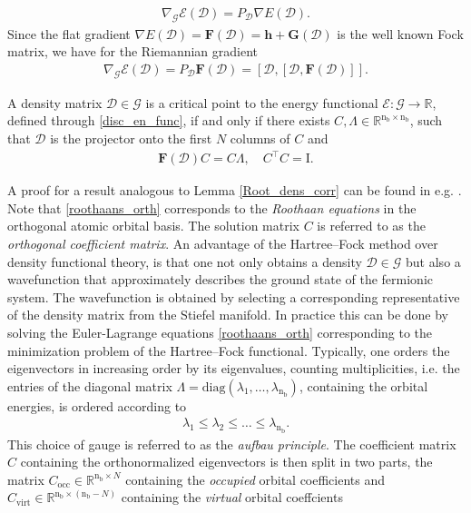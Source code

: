 \documentclass[reqno]{amsart}
\begin{document}
\begin{align}
    \nabla_\mathcal{G}\mathcal{E}(\mathscr{D})=P_\mathscr{D}\nabla E(\mathscr{D}).
\end{align}
Since the flat gradient $\nabla E(\mathscr{D})=\mathbf{F}(\mathscr{D})=\mathbf{h}+\mathbf{G}(\mathscr{D})$ is the well known Fock matrix, we have for the Riemannian gradient
\begin{align}\label{riem_grad}
    \nabla_\mathcal{G}\mathcal{E}(\mathscr{D})=P_\mathscr{D} \mathbf{F}(\mathscr{D})=[\mathscr{D},[\mathscr{D},\mathbf{F}(\mathscr{D})]].
\end{align}



\begin{lemma}\label{Root_dens_corr}
    A density matrix $\mathscr{D}\in \mathcal{G}$ is a critical point to the energy functional $\mathcal{E}:\mathcal{G}\longrightarrow \mathbb{R}$, defined through \eqref{disc_en_func}, if and only if there exists $C, \Lambda\in \mathbb{R}^{\mathrm{n}_\mathrm{b}\times \mathrm{n}_\mathrm{b}}$, such that $\mathscr{D}$ is the projector onto the first $N$ columns of $C$ and
    \begin{align}\label{roothaans_orth}
        \mathbf{F}(\mathscr{D})C=C\Lambda, \quad C^\top C=\mathrm{I}.
    \end{align}
\end{lemma} A proof for a result analogous to Lemma \ref{Root_dens_corr} can be found in e.g. \cite{refId0}. Note that \eqref{roothaans_orth} corresponds to the \textit{Roothaan equations} in the orthogonal atomic orbital basis. The solution matrix $C$ is referred to as the \textit{orthogonal coefficient matrix}. An advantage of the Hartree–Fock method over density functional theory, is that one not only obtains a density $\mathscr{D}\in \mathcal{G}$ but also a wavefunction that approximately describes the ground state of the fermionic system. The wavefunction is obtained by selecting a corresponding representative of the density matrix from the Stiefel manifold. In practice this can be done by solving the Euler-Lagrange equations \eqref{roothaans_orth} corresponding to the minimization problem of the Hartree–Fock functional. Typically, one orders the eigenvectors in increasing order by its eigenvalues, counting multiplicities, i.e. the entries of the diagonal matrix $\Lambda =\text{diag}(\lambda_1,\ldots,\lambda_{\text{n}_\text{b}}) $, containing the orbital energies, is ordered according to
\begin{align}
    \lambda_1\le \lambda_2\le\ldots\le \lambda_{\text{n}_\text{b}}.
\end{align}
This choice of gauge is referred to as the \textit{aufbau principle}. The coefficient matrix $C$ containing the orthonormalized eigenvectors is then split in two parts, the matrix $C_{\text{occ}}\in \mathbb{R}^{\text{n}_\text{b}\times N}$ containing the \textit{occupied} orbital coefficients and $C_{\text{virt}}\in \mathbb{R}^{\text{n}_\text{b}\times(\text{n}_\text{b}-N) }$ containing the \textit{virtual} orbital coeffcients
\end{document}
